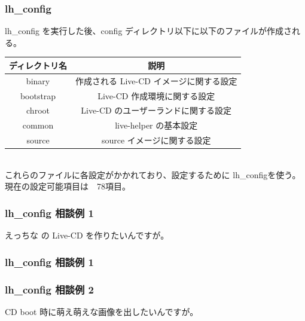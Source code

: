 \documentclass[cjk,dvipdfmx,12pt]{beamer}
\newenvironment{commandline}%
{\VerbatimEnvironment
  \begin{Sbox}\begin{minipage}{0.9\hsize}\begin{fontsize}{10}{10} \begin{BVerbatim}}%
{\end{BVerbatim}\end{fontsize}\end{minipage}\end{Sbox}
  \setlength{\fboxsep}{8pt}

\vspace{6pt}%
\fcolorbox{dancerdarkblue}{dancerlightblue}{\TheSbox}

\vspace{6pt}%
}
\begin{document}
\begin{frame}
\frametitle{lh\_config}
lh\_config を実行した後、config ディレクトリ以下に以下のファイルが作成される。
\begin{tabular}{|c|c|}
\hline
ディレクトリ名 & 説明 \\ \hline \hline
binary & 作成される Live-CD イメージに関する設定\\ \hline
bootstrap & Live-CD 作成環境に関する設定\\ \hline
chroot & Live-CD のユーザーランドに関する設定\\ \hline
common & live-helper の基本設定\\ \hline
source & source イメージに関する設定\\ \hline
\end{tabular}
\pause
\\
これらのファイルに各設定がかかれており、設定するために {\color{red} lh\_config}を使う。\\
現在の設定可能項目は　78項目。
\end{frame}

\begin{frame}[containsverbatim]
\frametitle{lh\_config 相談例 1}
\begin{center}\large
えっちな の Live-CD を作りたいんですが。
\end{center}
\end{frame}

\begin{frame}[containsverbatim]
\frametitle{lh\_config 相談例 1}
\large
{}
\end{frame}

\begin{frame}[containsverbatim]
\frametitle{lh\_config 相談例 2}
\begin{center}\large
CD boot 時に萌え萌えな画像を出したいんですが。
\end{center}
\end{frame}
\end{document}
